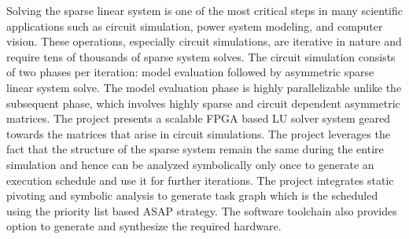 \begin{Abstract}
\noindent
Solving the sparse linear system is one of the most critical steps in many 
scientific applications such as circuit simulation, power system modeling, 
and computer vision. These operations, especially circuit simulations, are iterative 
in nature and require tens of thousands of sparse system solves. The circuit simulation 
consists of two phases per iteration: model evaluation followed by asymmetric sparse linear system solve. 
The model evaluation phase is highly parallelizable unlike the subsequent phase, 
which involves highly sparse and circuit dependent asymmetric matrices. The 
project presents a scalable FPGA based LU solver system geared towards the 
matrices that arise in circuit simulations. 
The project leverages the fact that the structure of the sparse system remain 
the same during the entire simulation and hence can be analyzed symbolically 
only once to generate an execution schedule and use it for further iterations.
The project integrates static pivoting and symbolic analysis to generate task graph which is the 
scheduled using the priority list based ASAP strategy. The software toolchain 
also provides option to generate and synthesize the required hardware. 

\end{Abstract}